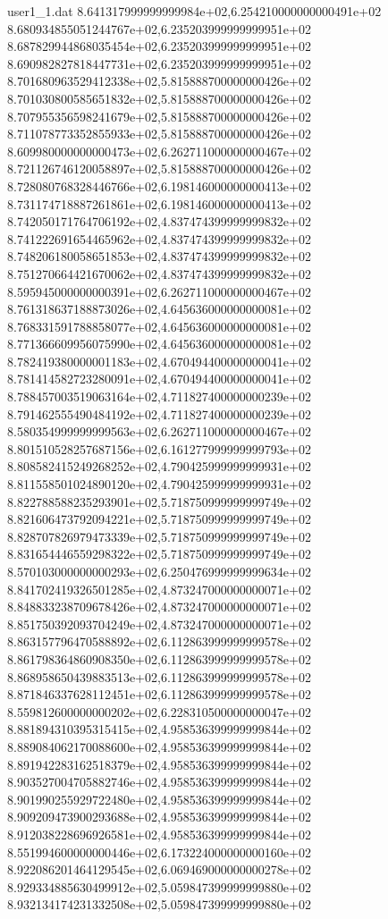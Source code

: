 \begin{filecontents}{user1_1.dat}
8.641317999999999984e+02,6.254210000000000491e+02
8.680934855051244767e+02,6.235203999999999951e+02
8.687829944868035454e+02,6.235203999999999951e+02
8.690982827818447731e+02,6.235203999999999951e+02
8.701680963529412338e+02,5.815888700000000426e+02
8.701030800585651832e+02,5.815888700000000426e+02
8.707955356598241679e+02,5.815888700000000426e+02
8.711078773352855933e+02,5.815888700000000426e+02
8.609980000000000473e+02,6.262711000000000467e+02
8.721126746120058897e+02,5.815888700000000426e+02
8.728080768328446766e+02,6.198146000000000413e+02
8.731174718887261861e+02,6.198146000000000413e+02
8.742050171764706192e+02,4.837474399999999832e+02
8.741222691654465962e+02,4.837474399999999832e+02
8.748206180058651853e+02,4.837474399999999832e+02
8.751270664421670062e+02,4.837474399999999832e+02
8.595945000000000391e+02,6.262711000000000467e+02
8.761318637188873026e+02,4.645636000000000081e+02
8.768331591788858077e+02,4.645636000000000081e+02
8.771366609956075990e+02,4.645636000000000081e+02
8.782419380000001183e+02,4.670494400000000041e+02
8.781414582723280091e+02,4.670494400000000041e+02
8.788457003519063164e+02,4.711827400000000239e+02
8.791462555490484192e+02,4.711827400000000239e+02
8.580354999999999563e+02,6.262711000000000467e+02
8.801510528257687156e+02,6.161277999999999793e+02
8.808582415249268252e+02,4.790425999999999931e+02
8.811558501024890120e+02,4.790425999999999931e+02
8.822788588235293901e+02,5.718750999999999749e+02
8.821606473792094221e+02,5.718750999999999749e+02
8.828707826979473339e+02,5.718750999999999749e+02
8.831654446559298322e+02,5.718750999999999749e+02
8.570103000000000293e+02,6.250476999999999634e+02
8.841702419326501285e+02,4.873247000000000071e+02
8.848833238709678426e+02,4.873247000000000071e+02
8.851750392093704249e+02,4.873247000000000071e+02
8.863157796470588892e+02,6.112863999999999578e+02
8.861798364860908350e+02,6.112863999999999578e+02
8.868958650439883513e+02,6.112863999999999578e+02
8.871846337628112451e+02,6.112863999999999578e+02
8.559812600000000202e+02,6.228310500000000047e+02
8.881894310395315415e+02,4.958536399999999844e+02
8.889084062170088600e+02,4.958536399999999844e+02
8.891942283162518379e+02,4.958536399999999844e+02
8.903527004705882746e+02,4.958536399999999844e+02
8.901990255929722480e+02,4.958536399999999844e+02
8.909209473900293688e+02,4.958536399999999844e+02
8.912038228696926581e+02,4.958536399999999844e+02
8.551994600000000446e+02,6.173224000000000160e+02
8.922086201464129545e+02,6.069469000000000278e+02
8.929334885630499912e+02,5.059847399999999880e+02
8.932134174231332508e+02,5.059847399999999880e+02

\end{filecontents}
